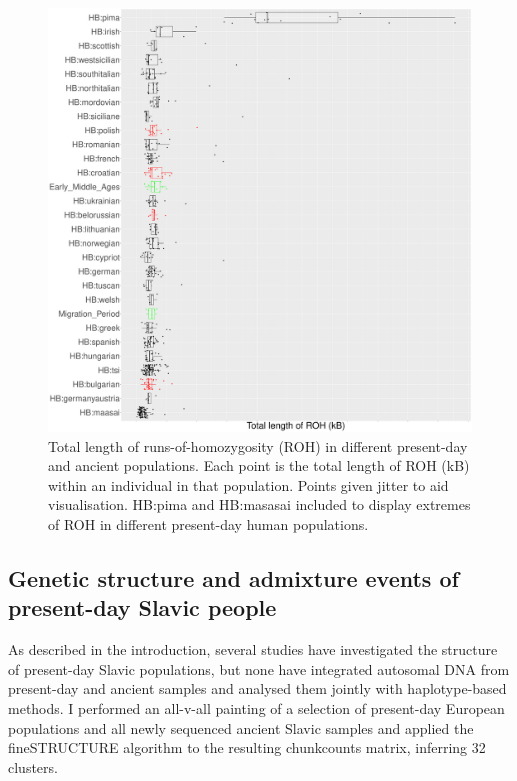 \begin{figure}[htp]
    \centering
    \includegraphics[width=1.0\textwidth]{../images/chapter5/ROH_plot.pdf}
    \caption{Total length of runs-of-homozygosity (ROH) in different present-day and ancient populations. Each point is the total length of ROH (kB) within an individual in that population. Points given jitter to aid visualisation. HB:pima and HB:masasai included to display extremes of ROH in different present-day human populations.}
    \label{fig:ROH}
\end{figure} 

\subsection{Genetic structure and admixture events of present-day Slavic people}

As described in the introduction, several studies have investigated the structure of present-day Slavic populations, but none have integrated autosomal DNA from present-day and ancient samples and analysed them jointly with haplotype-based methods. I performed an all-v-all painting of a selection of present-day European populations and all newly sequenced ancient Slavic samples and applied the fineSTRUCTURE algorithm to the resulting chunkcounts matrix, inferring 32 clusters.

